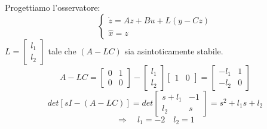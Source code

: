 \documentclass[../main.tex]{subfiles}
\begin{document}
\begin{mdframed}[style=Exercise]
\begin{Exercise}[title={Stabilizzazione di un sistema con osservatore}, difficulty=1]
				Progettiamo l'osservatore:
				\[
					\begin{cases}
						\dot z = Az + Bu +L(y-Cz)\\
						\hat x = z
					\end{cases}
				\]
				$ L = \begin{bmatrix} l_1 \\ l_2 \end{bmatrix} $ tale che $ (A-LC) $ sia asintoticamente stabile.
				\[
					A-LC = 
					\begin{bmatrix}
						0 & 1\\
						0 & 0
					\end{bmatrix} -
					\begin{bmatrix}
						l_1\\
						l_2
					\end{bmatrix}
					\begin{bmatrix}
						1 & 0
					\end{bmatrix} = 
					\begin{bmatrix}
						-l_1 & 1\\
						-l_2 & 0
					\end{bmatrix}
				\]
				\[
					det\left[ sI - (A-LC) \right] = det 
					\begin{bmatrix}
						s+l_1 & -1\\
						l_2 & s
					\end{bmatrix} = s^2 + l_1 s + l_2
				\]
				\[
					\Rightarrow\quad l_1 = -2 \quad l_2 = 1
				\]
			\end{Exercise}
		\end{mdframed}
\end{document}
